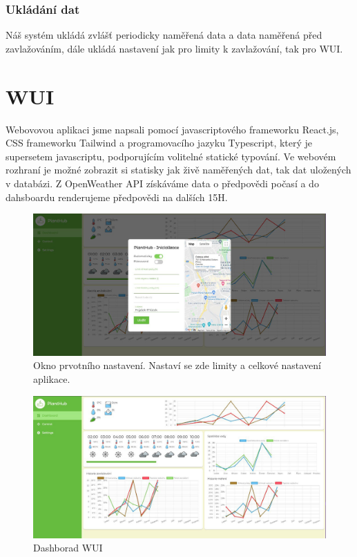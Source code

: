 \documentclass[12pt,a4paper]{article}
\begin{document}
\subsubsection{Ukládání dat}

Náš systém ukládá zvlášť periodicky naměřená data a data naměřená před
zavlažováním, dále ukládá nastavení jak pro limity k zavlažování, tak pro
WUI.

\section{WUI}

Webovovou aplikaci jsme napsali pomocí javascriptového frameworku
React.js, CSS frameworku
Tailwind a programovacího jazyku Typescript, který je supersetem javascriptu,
podporujícím volitelné statické typování. Ve webovém rozhraní je možné zobrazit
si statisky jak živě
naměřených dat, tak dat uložených v databázi. Z OpenWeather API získáváme data
o předpovědi počasí a do dahsboardu renderujeme předpovědi na dalších 15H.

\begin{figure}[h]
	\centering
	\includegraphics[width=\linewidth]{ui-inicializace.jpg}
	\caption{Okno prvotního nastavení. Nastaví se zde limity a celkové
		nastavení aplikace.}
\end{figure}

\begin{figure}[h]
	\centering
	\includegraphics[width=\linewidth]{web-ui.png}
	\caption{Dashborad WUI}
\end{figure}
\end{document}
